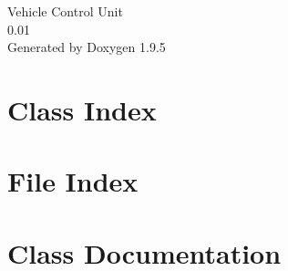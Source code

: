\documentclass[twoside]{book}
\newcommand{\+}{\discretionary{\mbox{\scriptsize$\hookleftarrow$}}{}{}}
\newcommand{\clearemptydoublepage}{%
    \newpage{\pagestyle{empty}\cleardoublepage}%
  }
\begin{document}
  \raggedbottom
    \hypersetup{pageanchor=false,
                bookmarksnumbered=true,
                pdfencoding=unicode
               }
  \begin{titlepage}
  \vspace*{7cm}
  \begin{center}%
  {\Large Vehicle Control Unit}\\
  [1ex]\large 0.\+01 \\
  \vspace*{1cm}
  {\large Generated by Doxygen 1.9.5}\\
  \end{center}
  \end{titlepage}
  \clearemptydoublepage
  \tableofcontents
  \clearemptydoublepage
  \hypersetup{pageanchor=true}
\chapter{Class Index}

\chapter{File Index}

\chapter{Class Documentation}






























\end{document}
